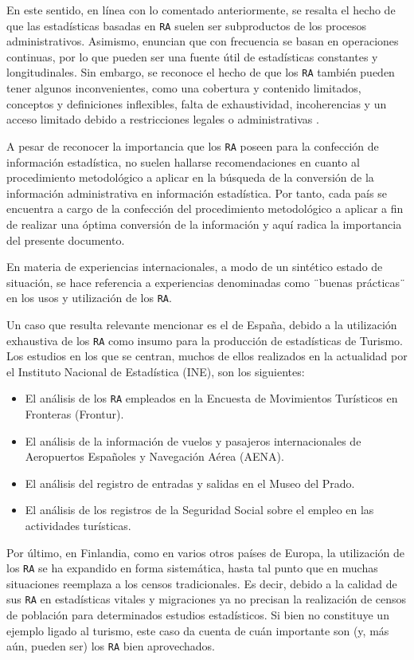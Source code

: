 \documentclass[
]{book}
\begin{document}
En este sentido, en línea con lo comentado anteriormente, se resalta el hecho de que las estadísticas basadas en \texttt{RA} suelen ser subproductos de los procesos administrativos. Asimismo, enuncian que con frecuencia se basan en operaciones continuas, por lo que pueden ser una fuente útil de estadísticas constantes y longitudinales. Sin embargo, se reconoce el hecho de que los \texttt{RA} también pueden tener algunos inconvenientes, como una cobertura y contenido limitados, conceptos y definiciones inflexibles, falta de exhaustividad, incoherencias y un acceso limitado debido a restricciones legales o administrativas \citep{omt2010}.

A pesar de reconocer la importancia que los \texttt{RA} poseen para la confección de información estadística, no suelen hallarse recomendaciones en cuanto al procedimiento metodológico a aplicar en la búsqueda de la conversión de la información administrativa en información estadística. Por tanto, cada país se encuentra a cargo de la confección del procedimiento metodológico a aplicar a fin de realizar una óptima conversión de la información y aquí radica la importancia del presente documento.

En materia de experiencias internacionales, a modo de un sintético estado de situación, se hace referencia a experiencias denominadas como ¨buenas prácticas¨ en los usos y utilización de los \texttt{RA}.

Un caso que resulta relevante mencionar es el de España, debido a la utilización exhaustiva de los \texttt{RA} como insumo para la producción de estadísticas de Turismo. Los estudios en los que se centran, muchos de ellos realizados en la actualidad por el Instituto Nacional de Estadística (INE), son los siguientes:

\begin{itemize}
\item
  El análisis de los \texttt{RA} empleados en la Encuesta de Movimientos Turísticos en Fronteras (Frontur).
\item
  El análisis de la información de vuelos y pasajeros internacionales de Aeropuertos Españoles y Navegación Aérea (AENA).
\item
  El análisis del registro de entradas y salidas en el Museo del Prado.
\item
  El análisis de los registros de la Seguridad Social sobre el empleo en las actividades turísticas.
\end{itemize}

Por último, en Finlandia, como en varios otros países de Europa, la utilización de los \texttt{RA} se ha expandido en forma sistemática, hasta tal punto que en muchas situaciones reemplaza a los censos tradicionales. Es decir, debido a la calidad de sus \texttt{RA} en estadísticas vitales y migraciones ya no precisan la realización de censos de población para determinados estudios estadísticos. Si bien no constituye un ejemplo ligado al turismo, este caso da cuenta de cuán importante son (y, más aún, pueden ser) los \texttt{RA} bien aprovechados.
\end{document}
